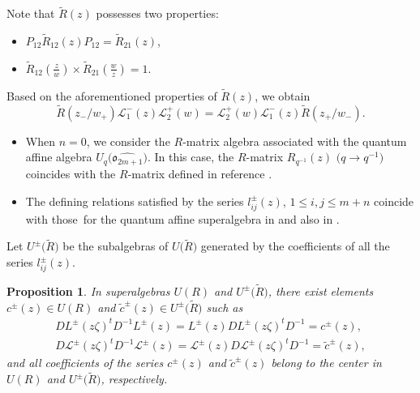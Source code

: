 \documentclass[10pt,a4paper]{amsart}
\numberwithin{equation}{section}
\newtheorem{Proposition}[Theorem]{Proposition}
 { \theoremstyle{definition}
\newtheorem{Definition}[Theorem]{Definition}
\newtheorem{Note}[Theorem]{Note}
\newtheorem{Example}[Theorem]{Example}
\newtheorem{Remark}[Theorem]{Remark} }
\begin{document}
Note that $\widetilde{R}(z)$ possesses two properties:
\begin{itemize}\itemsep=0pt
 \item[(1)] $P_{12}\widetilde{R}_{12}(z)P_{12}=\widetilde{R}_{21}(z)$,
 \item[(2)] $\widetilde{R}_{12}\left(\frac{z}{w}\right)\times
 \widetilde{R}_{21}\left(\frac{w}{z}\right)=1$.
\end{itemize}
Based on the aforementioned properties of $\widetilde{R}(z)$, we obtain
\[%
 \widetilde{R}(z_-/w_+)\mathcal{L}_1^{-}(z)\mathcal{L}_2^{+}(w)=\mathcal{L}_2^{+}(w)\mathcal{L}_1^{-}(z)\widetilde{R}(z_+/w_-).
\]
\begin{Remark}\label{RM2}\quad
\begin{itemize}\itemsep=0pt
 \item[(1)] When $n=0$, we consider the $R$-matrix algebra associated with the quantum affine algebra $U_q\bigl(\widehat{\mathfrak{o}_{2m+1}}\bigr)$.
 In this case, the $R$-matrix $R_{q^{-1}}(z)$ $\bigl(q\rightarrow q^{-1}\bigr)$ coincides with the $R$-matrix defined in reference \cite{MJB2}.
 \item[(2)] The defining relations satisfied by the series $l_{ij}^{\pm}(z)$, $1\leq i,j \leq m+n$ coincide with those~for the quantum affine superalgebra  in \cite{HBKD} and also in \cite{YZC}.
\end{itemize}
\end{Remark}



Let $U^{\pm}\bigl(\widetilde{R}\bigr)$ be the subalgebras of $U\bigl(\widetilde{R}\bigr)$ generated by the coefficients of all the series $l_{ij}^{\pm}(z)$.
\begin{Proposition}\label{Apr2}
In superalgebras $U(R)$ and $U^{\pm}\bigl(\widetilde{R}\bigr)$, there exist elements $c^{\pm}(z)\in U(R)$ and $\widetilde{c}^{\pm}(z)\in U^{\pm}\bigl(\widetilde{R}\bigr)$ such as
\begin{gather}%
 DL^{\pm}(z\zeta)^tD^{-1}L^{\pm}(z)=L^{\pm}(z)DL^{\pm}(z\zeta)^tD^{-1}=c^{\pm}(z),\nonumber\\
 D\mathcal{L}^{\pm}(z\zeta)^tD^{-1}\mathcal{L}^{\pm}(z)=\mathcal{L}^{\pm}(z)D\mathcal{L}^{\pm}(z\zeta)^tD^{-1}=\widetilde{c}^{\pm}(z), \label{d9}
\end{gather}
and all coefficients of the series $c^{\pm}(z)$ and $\widetilde{c}^{\pm}(z)$ belong to the center in $U(R)$ and $U^{\pm}\bigl(\widetilde{R}\bigr)$, respectively.
\end{Proposition}
\end{document}
